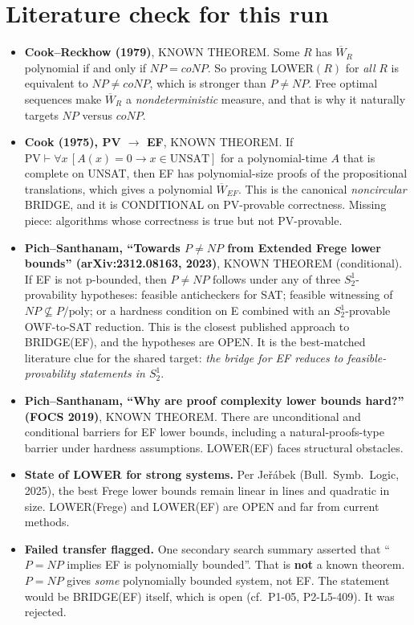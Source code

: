 \documentclass[11pt]{article}
\theoremstyle{definition}\newtheorem{definition}[theorem]{Definition}
\begin{document}
\section{Literature check for this run}
\begin{itemize}
\item \textbf{Cook--Reckhow (1979)}, KNOWN THEOREM. Some $R$ has $\overline W_R$ polynomial if and only if $NP=coNP$. So proving LOWER$(R)$ for \emph{all} $R$ is equivalent to $NP\ne coNP$, which is stronger than $P\neq NP$. Free optimal sequences make $\overline W_R$ a \emph{nondeterministic} measure, and that is why it naturally targets $NP$ versus $coNP$.
\item \textbf{Cook (1975), PV $\to$ EF}, KNOWN THEOREM. If $\mathrm{PV}\vdash\forall x\,[A(x)=0\to x\in\mathrm{UNSAT}]$ for a polynomial-time $A$ that is complete on UNSAT, then EF has polynomial-size proofs of the propositional translations, which gives a polynomial $\overline W_{EF}$. This is the canonical \emph{noncircular} BRIDGE, and it is CONDITIONAL on PV-provable correctness. Missing piece: algorithms whose correctness is true but not PV-provable.
\item \textbf{Pich--Santhanam, ``Towards $P\ne NP$ from Extended Frege lower bounds'' (arXiv:2312.08163, 2023)}, KNOWN THEOREM (conditional). If EF is not p-bounded, then $P\neq NP$ follows under any of three $S^1_2$-provability hypotheses: feasible anticheckers for SAT; feasible witnessing of $NP\not\subseteq P/\mathrm{poly}$; or a hardness condition on E combined with an $S^1_2$-provable OWF-to-SAT reduction. This is the closest published approach to BRIDGE(EF), and the hypotheses are OPEN. It is the best-matched literature clue for the shared target: \emph{the bridge for EF reduces to feasible-provability statements in $S^1_2$}.
\item \textbf{Pich--Santhanam, ``Why are proof complexity lower bounds hard?'' (FOCS 2019)}, KNOWN THEOREM. There are unconditional and conditional barriers for EF lower bounds, including a natural-proofs-type barrier under hardness assumptions. LOWER(EF) faces structural obstacles.
\item \textbf{State of LOWER for strong systems.} Per Je\v{r}\'abek (Bull.\ Symb.\ Logic, 2025), the best Frege lower bounds remain linear in lines and quadratic in size. LOWER(Frege) and LOWER(EF) are OPEN and far from current methods.
\item \textbf{Failed transfer flagged.} One secondary search summary asserted that ``$P=NP$ implies EF is polynomially bounded''. That is \textbf{not} a known theorem. $P=NP$ gives \emph{some} polynomially bounded system, not EF. The statement would be BRIDGE(EF) itself, which is open (cf.\ P1-05, P2-L5-409). It was rejected.
\end{itemize}
\end{document}
